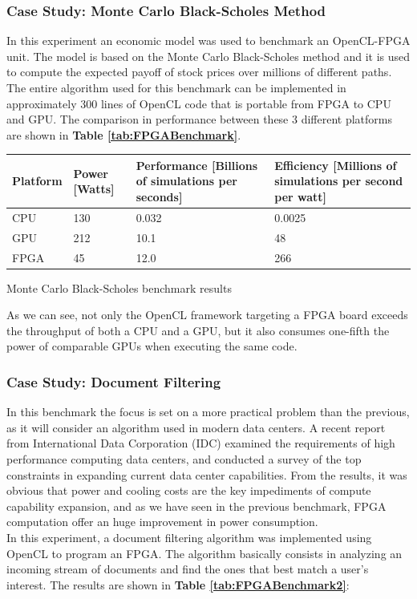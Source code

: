 \subsubsection{Case Study: Monte Carlo Black-Scholes Method}

In this experiment an economic model was used to benchmark an OpenCL-FPGA unit. The model is based on the 
Monte Carlo Black-Scholes method and it is used to compute the expected payoff of stock prices over millions of different paths. The entire algorithm used for this benchmark can be implemented in approximately 300 lines of
OpenCL code that is portable from FPGA to CPU and GPU. The comparison in performance  between these 3 different platforms are shown in \textbf{Table \ref{tab:FPGABenchmark}}.\\

\begin{tablehere}
{\footnotesize
\begin{tabular}{|p{}|p{}|p{}|p{}|}\hline
\textbf{Platform} & \textbf{Power} [Watts] & \textbf{Performance} [Billions of simulations per seconds] & \textbf{Efficiency} [Millions of simulations per second per watt]\\ \hline
CPU & 130 & 0.032 & 0.0025 \\ \hline
GPU & 212 & 10.1 & 48 \\ \hline
FPGA & 45 & 12.0 & 266 \\ \hline
\end{tabular}}
  \caption{Monte Carlo Black-Scholes benchmark results\\}
	\label{tab:FPGABenchmark}
\end{tablehere}

As we can see, not only the OpenCL framework targeting a FPGA board exceeds the throughput of both a CPU and a GPU, but it also consumes one-fifth the power of comparable GPUs when executing the same code.

\subsubsection{Case Study: Document Filtering}

In this benchmark the focus is set on a more practical problem than the previous, as it will consider an algorithm used in modern data centers.
A recent report \cite{walsh:power} from International Data Corporation (IDC) examined the requirements of high performance computing data centers, and conducted a survey of the top constraints in expanding current data center capabilities. From the results, it was obvious that power and cooling costs are the key impediments of compute capability expansion, and as we have seen in the previous benchmark, FPGA computation offer an huge improvement in power consumption.\\
In this experiment, a document filtering algorithm was implemented using OpenCL to program an FPGA. The algorithm basically consists in analyzing an incoming stream of documents and find the ones that best match a user's interest. The results are shown in \textbf{Table \ref{tab:FPGABenchmark2}}:\\

